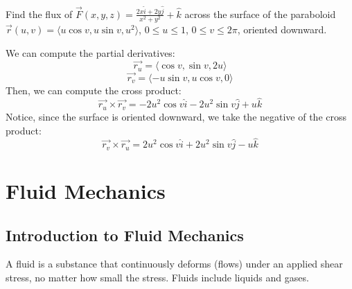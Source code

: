 \documentclass[11pt]{report}
\begin{document}
\begin{example}
    Find the flux of $\vec{F}(x,y,z) = \frac{2x \hat{i} + 2y \hat{j}}{x^2 + y^2} + \hat{k}$ across the surface of the paraboloid $\vec{r}(u, v) = \langle u \cos v, u \sin v, u^2 \rangle$, $0 \leq u \leq 1$, $0 \leq v \leq 2\pi$, oriented downward.

    We can compute the partial derivatives:
    $$        \vec{r_u} = \langle \cos v, \sin v, 2u \rangle $$
    $$        \vec{r_v} = \langle -u \sin v, u \cos v, 0 \rangle $$
    Then, we can compute the cross product:
    $$        \vec{r_u} \times \vec{r_v} = -2u^2 \cos v \hat{i} - 2u^2 \sin v \hat{j} + u \hat{k}
    $$
    Notice, since the surface is oriented downward, we take the negative of the cross product:
    $$        \vec{r_v} \times \vec{r_u} = 2u^2 \cos v \hat{i} + 2u^2 \sin v \hat{j} - u \hat{k}
    $$
\end{example}
\chapter{Fluid Mechanics}
\section{Introduction to Fluid Mechanics}
\begin{definition}[Fluid]
    A fluid is a substance that continuously deforms (flows) under an applied shear stress, no matter how small the stress. Fluids include liquids and gases.
    
\end{definition}
\end{document}
